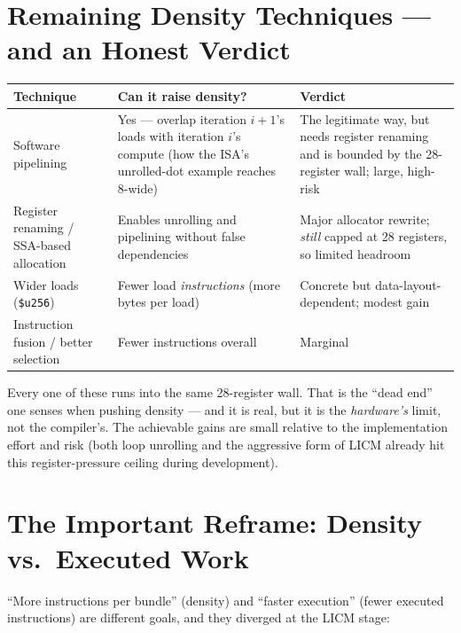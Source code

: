 \documentclass[11pt,a4paper]{article}
\begin{document}
\section{Remaining Density Techniques --- and an Honest Verdict}

\begin{table}[h]
\centering
\begin{tabular}{@{}p{4.3cm}p{4.3cm}p{4.6cm}@{}}
\toprule
Technique & Can it raise density? & Verdict \\
\midrule
Software pipelining & Yes --- overlap iteration $i{+}1$'s loads with iteration $i$'s
  compute (how the ISA's unrolled-dot example reaches 8-wide) & The legitimate way, but needs
  register renaming and is bounded by the 28-register wall; large, high-risk \\
Register renaming / SSA-based allocation & Enables unrolling and pipelining without false
  dependencies & Major allocator rewrite; \emph{still} capped at 28 registers, so limited
  headroom \\
Wider loads (\texttt{\$u256}) & Fewer load \emph{instructions} (more bytes per load) &
  Concrete but data-layout-dependent; modest gain \\
Instruction fusion / better selection & Fewer instructions overall & Marginal \\
\bottomrule
\end{tabular}
\end{table}

Every one of these runs into the same 28-register wall. That is the ``dead end'' one senses
when pushing density --- and it is real, but it is the \emph{hardware's} limit, not the
compiler's. The achievable gains are small relative to the implementation effort and risk
(both loop unrolling and the aggressive form of LICM already hit this register-pressure
ceiling during development).

\section{The Important Reframe: Density vs.\ Executed Work}

``More instructions per bundle'' (density) and ``faster execution'' (fewer executed
instructions) are different goals, and they diverged at the LICM stage:
\end{document}
